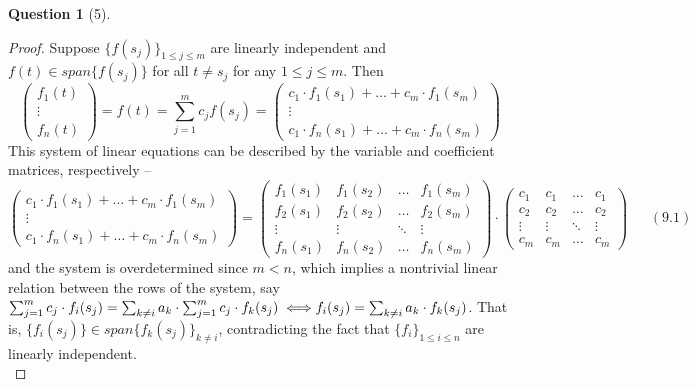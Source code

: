 \documentclass[11pt]{article}
\theoremstyle{quest}
\newtheorem*{question}{Question}
\begin{document}
\begin{question}[5]
\end{question}
\begin{proof}
Suppose $\{f(s_j)\}_{1 \le j \le m}$ are linearly independent and $f(t) \in span\{f(s_j)\}$ for all $t \ne s_j$ for any $1 \le j \le m$. Then
$$\begin{pmatrix}
f_1(t) \\
\vdots \\
f_n(t)
\end{pmatrix} = f(t) = \sum_{j=1}^m c_j f(s_j) = \begin{pmatrix}
c_1 \cdot f_1(s_1) + \ldots + c_m \cdot f_1(s_m) \\
\vdots \\
c_1 \cdot f_n(s_1) + \ldots + c_m \cdot f_n(s_m)
\end{pmatrix}$$
This system of linear equations can be described by the variable and coefficient matrices, respectively -- 
$$\begin{pmatrix}
c_1 \cdot f_1(s_1) + \ldots + c_m \cdot f_1(s_m) \\
\vdots \\
c_1 \cdot f_n(s_1) + \ldots + c_m \cdot f_n(s_m)
\end{pmatrix} = \begin{pmatrix}
f_1(s_1) & f_1(s_2) & \ldots & f_1(s_m) \\
f_2(s_1) & f_2(s_2) & \ldots & f_2(s_m) \\
\vdots & \vdots & \ddots & \vdots \\
f_n(s_1) & f_n(s_2) & \ldots & f_n(s_m)
\end{pmatrix} \cdot \begin{pmatrix} c_1 & c_1 & \ldots & c_1 \\
c_2 & c_2 & \ldots & c_2 \\
\vdots & \vdots & \ddots & \vdots \\
c_m & c_m & \ldots & c_m
\end{pmatrix}\ \ \ \ \ \ \ (9.1)$$
and the system is overdetermined since $m < n$, 
which implies a nontrivial linear relation between the rows of the system, say $\sum_{j=1}^m c_j \cdot f_i(s_j) = \sum_{k \ne i} a_k \cdot \sum_{j=1}^m c_j \cdot f_k(s_j) \iff \\f_i(s_j) = \sum_{k \ne i} a_k \cdot f_k(s_j)$. That is, $\{f_i(s_j)\} \in span\{f_k(s_j)\}_{k \ne i}$, contradicting the fact that $\{f_i\}_{1 \le i \le n}$ are linearly independent.
\\
\end{proof}
\end{document}
